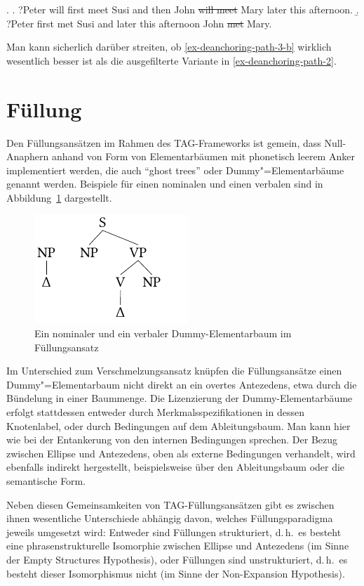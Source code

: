 \ex.
\a. ?Peter will first meet Susi and then John \sout{will meet} Mary later this afternoon.\label{ex-deanchoring-path-3-a}
\b. ?Peter first met Susi and later this afternoon John \sout{met} Mary.\label{ex-deanchoring-path-3-b} 

Man kann sicherlich darüber streiten, ob \ref{ex-deanchoring-path-3-b} wirklich wesentlich besser ist als die ausgefilterte Variante in \ref{ex-deanchoring-path-2}.


\section{Füllung} \label{sec-fuellung}

Den Füllungsansätzen im Rahmen des TAG-Frameworks ist gemein, dass Null-Anaphern anhand von Form von Elementarbäumen mit phonetisch leerem Anker implementiert werden, die auch "`ghost trees"' \citep{Seddah:Sagot:06} oder Dummy"=Elementarbäume genannt werden. Beispiele für einen nominalen und einen verbalen  sind in Abbildung~\ref{fig-tag-fuellung-1} dargestellt.
\begin{figure}[t]
\centering
\includegraphics[angle=90]{graphics/abb824.pdf}
\caption{\label{fig-tag-fuellung-1}Ein nominaler und ein verbaler Dummy-Elementarbaum im Füllungsansatz}
\end{figure}  
Im Unterschied zum Verschmelzungsansatz knüpfen die Füllungsansätze einen Dummy"=Elementarbaum nicht direkt an ein overtes Antezedens, etwa durch die Bündelung in einer Baummenge. Die Lizenzierung der Dummy-Elementarbäume erfolgt stattdessen entweder durch Merkmalsspezifikationen in dessen Knotenlabel, oder durch Bedingungen auf dem Ableitungsbaum. Man kann hier wie bei der Entankerung von den internen Bedingungen sprechen. Der Bezug zwischen Ellipse und Antezedens, oben als externe Bedingungen verhandelt, wird ebenfalls indirekt hergestellt, beispielsweise über den Ableitungsbaum oder die semantische Form.

Neben diesen Gemeinsamkeiten von TAG-Füllungsansätzen gibt es zwischen ihnen wesentliche Unterschiede abhängig davon, welches Füllungsparadigma jeweils umgesetzt wird: Entweder sind Füllungen strukturiert, d.\,h.\ es besteht eine phrasenstrukturelle Isomorphie zwischen Ellipse und Antezedens (im Sinne der Empty Structures Hypothesis), oder Füllungen sind unstrukturiert, d.\,h.\ es besteht dieser Isomorphismus nicht (im Sinne der Non-Expansion Hypothesis).



